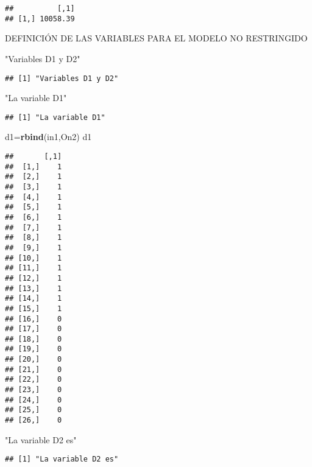 \documentclass[
]{article}
\newenvironment{Shaded}{\begin{snugshade}}{\end{snugshade}}
\newcommand{\KeywordTok}[1]{\textcolor[rgb]{0.13,0.29,0.53}{\textbf{#1}}}
\newcommand{\NormalTok}[1]{#1}
\newcommand{\StringTok}[1]{\textcolor[rgb]{0.31,0.60,0.02}{#1}}
\begin{document}
\begin{verbatim}
##          [,1]
## [1,] 10058.39
\end{verbatim}

DEFINICIÓN DE LAS VARIABLES PARA EL MODELO NO RESTRINGIDO

\begin{Shaded}
\begin{Highlighting}[]
\StringTok{"Variables D1 y D2"}
\end{Highlighting}
\end{Shaded}

\begin{verbatim}
## [1] "Variables D1 y D2"
\end{verbatim}

\begin{Shaded}
\begin{Highlighting}[]
\StringTok{"La variable D1"}
\end{Highlighting}
\end{Shaded}

\begin{verbatim}
## [1] "La variable D1"
\end{verbatim}

\begin{Shaded}
\begin{Highlighting}[]
\NormalTok{d1=}\KeywordTok{rbind}\NormalTok{(in1,On2)}
\NormalTok{d1}
\end{Highlighting}
\end{Shaded}

\begin{verbatim}
##       [,1]
##  [1,]    1
##  [2,]    1
##  [3,]    1
##  [4,]    1
##  [5,]    1
##  [6,]    1
##  [7,]    1
##  [8,]    1
##  [9,]    1
## [10,]    1
## [11,]    1
## [12,]    1
## [13,]    1
## [14,]    1
## [15,]    1
## [16,]    0
## [17,]    0
## [18,]    0
## [19,]    0
## [20,]    0
## [21,]    0
## [22,]    0
## [23,]    0
## [24,]    0
## [25,]    0
## [26,]    0
\end{verbatim}

\begin{Shaded}
\begin{Highlighting}[]
\StringTok{"La variable D2 es"}
\end{Highlighting}
\end{Shaded}

\begin{verbatim}
## [1] "La variable D2 es"
\end{verbatim}
\end{document}
